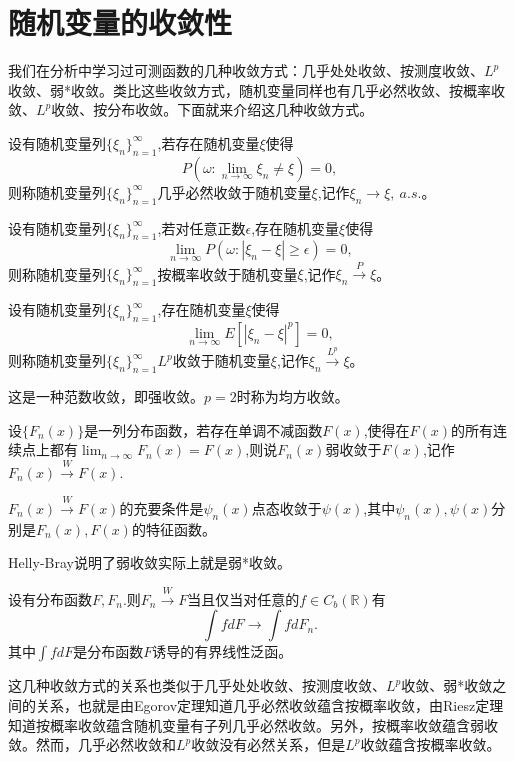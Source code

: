 \documentclass[lang=cn,10pt]{elegantbook}
\begin{document}
	\section{随机变量的收敛性}
	我们在分析中学习过可测函数的几种收敛方式：几乎处处收敛、按测度收敛、\(L^p\)收敛、弱*收敛。类比这些收敛方式，随机变量同样也有几乎必然收敛、按概率收敛、\(L^p\)收敛、按分布收敛。下面就来介绍这几种收敛方式。
	\begin{definition}[几乎必然收敛(a.s.)]
		设有随机变量列\(\{\xi_n\}_{n=1}^\infty\),若存在随机变量\(\xi\)使得
		\[P(\omega:\lim_{n \to \infty}\xi_n\ne \xi)=0,\]
		则称随机变量列\(\{\xi_n\}_{n=1}^\infty\)几乎必然收敛于随机变量\(\xi\),记作\(\xi_n\to \xi,\ a.s.\)。
	\end{definition}
	\begin{definition}[按概率收敛]
		设有随机变量列\(\{\xi_n\}_{n=1}^\infty\),若对任意正数\(\epsilon\),存在随机变量\(\xi\)使得
		\[\lim_{n \to \infty}P(\omega:|\xi_n-\xi|\ge \epsilon)=0,\]
		则称随机变量列\(\{\xi_n\}_{n=1}^\infty\)按概率收敛于随机变量\(\xi\),记作\(\xi_n\xrightarrow{P} \xi\)。
	\end{definition}
	\begin{definition}[\(L^p\)收敛]
		设有随机变量列\(\{\xi_n\}_{n=1}^\infty\),存在随机变量\(\xi\)使得
		\[\lim_{n \to \infty}E[|\xi_n-\xi|^p]=0,\]
		则称随机变量列\(\{\xi_n\}_{n=1}^\infty\)\(L^p\)收敛于随机变量\(\xi\),记作\(\xi_n\xrightarrow{L^p} \xi\)。
		
		这是一种范数收敛，即强收敛。\(p=2\)时称为均方收敛。
	\end{definition}
	\begin{definition}
		设\(\{F_n(x)\}\)是一列分布函数，若存在单调不减函数\(F(x)\),使得在\(F(x)\)的所有连续点上都有\(\lim_{n \to \infty}F_n(x)=F(x)\),则说\(F_n(x)\)弱收敛于\(F(x)\),记作\(F_n(x)\xrightarrow{W}F(x)\).
		
		\(F_n(x)\xrightarrow{W}F(x)\)的充要条件是\(\psi_n(x)\)点态收敛于\(\psi(x)\),其中\(\psi_n(x),\psi(x)\)分别是\(F_n(x),F(x)\)的特征函数。
	\end{definition}
	Helly-Bray说明了弱收敛实际上就是弱*收敛。
	\begin{theorem}
		设有分布函数\(F,F_n\).则\(F_n\xrightarrow{W}F\)当且仅当对任意的\(f\in C_b(\mathbb{R})\)有
		\[\int fdF\to\int fdF_n.\]
		其中\(\int fdF\)是分布函数\(F\)诱导的有界线性泛函。
	\end{theorem}
	这几种收敛方式的关系也类似于几乎处处收敛、按测度收敛、\(L^p\)收敛、弱*收敛之间的关系，也就是由Egorov定理知道几乎必然收敛蕴含按概率收敛，由Riesz定理知道按概率收敛蕴含随机变量有子列几乎必然收敛。另外，按概率收敛蕴含弱收敛。然而，几乎必然收敛和\(L^p\)收敛没有必然关系，但是\(L^p\)收敛蕴含按概率收敛。
	
\end{document}
